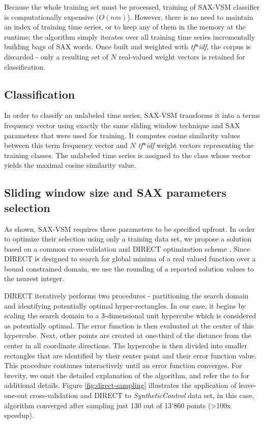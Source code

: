 \documentclass[conference]{IEEEtran}
\begin{document}
Because the whole training set must be processed, 
training of SAX-VSM classifier is computationally expensive ($O(nm)$). 
However, there is no need to maintain an index of training time series, 
or to keep any of them in the memory at the runtime;
the algorithm simply iterates over all training time series incrementally building 
bags of SAX words. Once built and weighted with \textit{tf$\ast$idf}, 
the corpus is discarded - only a resulting set of $N$ real-valued weight vectors 
is retained for classification. 

\subsection{Classification}
In order to classify an unlabeled time series, SAX-VSM transforms it into a
terms frequency vector using exactly the same sliding window technique 
and SAX parameters that were used for training. 
It computes cosine similarity values between this term frequency vector 
and $N$ \textit{tf$\ast$idf} weight vectors representing the training classes. 
The unlabeled time series is assigned to the class whose vector yields the
maximal cosine similarity value.

\subsection{Sliding window size and SAX parameters selection} \label{section-direct}
As shown, SAX-VSM requires three parameters to be specified upfront. 
In order to optimize their selection using only a training data set, we propose a solution based 
on a common cross-validation and DIRECT optimization scheme \cite{direct-original}.
Since DIRECT is designed to search for global minima of a real valued function 
over a bound constrained domain, we use the rounding of a reported solution values 
to the nearest integer.

DIRECT iteratively performs two procedures - partitioning the search domain and identifying 
potentially optimal hyper-rectangles.
In our case, it begins by scaling the search domain to a 3-dimensional unit hypercube 
which is considered as potentially optimal. 
The error function is then evaluated at the center of this hypercube. Next, other points are 
created at one-third of the distance from the center in all coordinate directions. 
The hypercube is then divided into smaller rectangles that are identified by their center point 
and their error function value. This procedure continues interactively until an error function
converges.
For brevity, we omit the detailed explanation of the algorithm, and refer the 
to \cite{direct} for additional details. Figure \ref{fig:direct-sampling} illustrates the application 
of leave-one-out cross-validation and DIRECT to \textit{SyntheticControl} data set, 
in this case, algorithm converged after sampling just 130 out of 13'860 points 
(\textgreater100x speedup).
\end{document}
